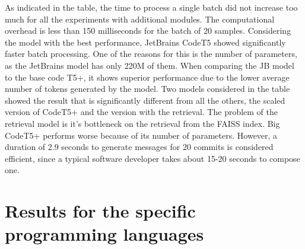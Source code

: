 As indicated in the table, the time to process a single batch did not increase too much for all the experiments with additional modules. The computational overhead is less than 150 milliseconds for the batch of 20 samples. Considering the model with the best performance, JetBrains CodeT5 showed significantly faster batch processing. One of the reasons for this is the number of parameters, as the JetBrains model has only 220M of them. When comparing the JB model to the base code T5+, it shows superior performance due to the lower average number of tokens generated by the model.
Two models considered in the table showed the result that is significantly different from all the others, the scaled version of CodeT5+ and the version with the retrieval. The problem of the retrieval model is it's bottleneck on the retrieval from the FAISS index. Big CodeT5+ performs worse because of its number of parameters. However, a duration of 2.9 seconds to generate messages for 20 commits is considered efficient, since a typical software developer takes about 15-20 seconds to compose one.


\section{Results for the specific programming languages}

